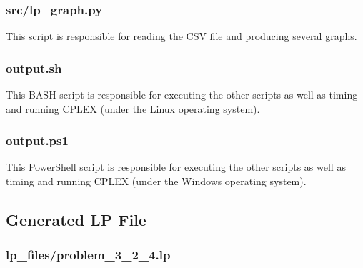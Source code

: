\documentclass[12pt]{article} %
\begin{document}
\subsubsection{src/lp\_graph.py}
This script is responsible for reading the CSV file and producing several graphs.


\subsubsection{output.sh}
This BASH script is responsible for executing the other scripts as well as timing and running CPLEX (under the Linux operating system).


\subsubsection{output.ps1}
This PowerShell script is responsible for executing the other scripts as well as timing and running CPLEX (under the Windows operating system).



\subsection{Generated LP File}

\subsubsection{lp\_files/problem\_3\_2\_4.lp}

\end{document}
